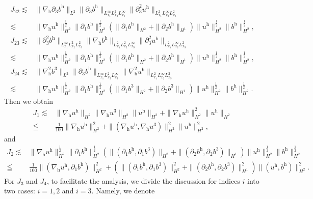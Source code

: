 \documentclass[11pt]{amsart}
\theoremstyle{definition}
\newcommand{\h}{\mathrm{h}}
\newcommand{\nablah}{\nabla_{\mathrm{h}}}
\numberwithin{equation}{section}
\begin{document}
\begin{align*}
	J_{22}\lesssim &\|\nablah\partial_3b^\h\|_{L^2}\|\partial_3 b^\h  \|_{L^\infty_{x_1}L^2_{x_2}L^\infty_{x_3}}\|\partial_3^2 u^\h \|_{L^2_{x_1}L^\infty_{x_2}L^2_{x_3}}\\
	\lesssim&\|\nabla_\mathrm{h} u^\mathrm{h}\|_{H^2}^\frac12\|\partial_1b^\h\|_{H^2}^\frac12\left(\|\partial_1 b^\h\|_{H^2}+\|\partial_2 b^\h\|_{H^1}\right)\|u^\mathrm{h}\|_{H^2}^\frac12\| b^\h\|_{H^2}^\frac12 ,\\
	J_{23}\lesssim &\|\partial_3^2b^\h\|_{L^\infty_{x_1}L^2_{x_2}L^2_{x_3}}\|\nablah b^\h\|_{L^2_{x_1}L^2_{x_2}L^\infty_{x_3}}\|\partial_3^2 u^\h \|_{L^2_{x_1}L^\infty_{x_2}L^2_{x_3}}	\\
	\lesssim&\|\nabla_\mathrm{h} u^\mathrm{h}\|_{H^2}^\frac12\|\partial_1b^\h\|_{H^2}^\frac12\left(\|\partial_1 b^\h\|_{H^2}+\|\partial_2 b^\h\|_{H^1}\right)\|u^\mathrm{h}\|_{H^2}^\frac12\| b^\h\|_{H^2}^\frac12 ,\\
	J_{24}\lesssim&\|\nablah^2 b^3 \|_{L^2}\|\partial_3 b^\h\|_{L^\infty_{x_1}L^2_{x_2}L^\infty_{x_3}}\|\nablah^2 u ^\h\|_{L^2_{x_1}L^\infty_{x_2}L^2_{x_3}}\\
	\lesssim&\|\nabla_\mathrm{h} u^\mathrm{h}\|_{H^2}^\frac12\|\partial_1b^\h\|_{H^2}^\frac12\left(\|\partial_1 b^3\|_{H^2}+\|\partial_2 b^3\|_{H^1}\right)\|u^\mathrm{h}\|_{H^2}^\frac12\| b^\h\|_{H^2}^\frac12 .
\end{align*}
Then we obtain
\begin{align}\label{J_1}
	J_1\lesssim& \|\nabla_\mathrm{h} u^\mathrm{h}\|_{H^2}\|\nabla_\mathrm{h} u^3\|_{H^2}\| u^\mathrm{h}\|_{H^2}+\|\nabla_\mathrm{h} u^\mathrm{h}\|_{H^2}^2\| u^\mathrm{h}\|_{H^2}\nonumber\\
	\leqq &\frac{1}{100}\|\nabla_\mathrm{h} u^\mathrm{h}\|_{H^2}^2+\|(\nabla_\mathrm{h} u^\mathrm{h},\nabla_\mathrm{h} u^{3})\|_{H^2}^2\| u^\mathrm{h}\|_{H^2}^2,
\end{align}
and
\begin{align}\label{J_2}
	J_2\lesssim&\|\nabla_\mathrm{h} u^\mathrm{h}\|_{H^2}^\frac12\|\partial_1b^\h\|_{H^2}^\frac12\left(\|(\partial_1 b^\h,\partial_1b^3)\|_{H^2}+\|(\partial_2 b^\h,\partial_2b^3)\|_{H^1}\right)\|u^\mathrm{h}\|_{H^2}^\frac12\| b^\h\|_{H^2}^\frac12\nonumber\\
	\leqq &\frac{1}{100}\|(\nabla_\mathrm{h} u^\mathrm{h},\partial_1b^\h)\|_{H^2}^2+\left(\|(\partial_1 b^\h,\partial_1b^3)\|_{H^2}^2+\|(\partial_2 b^\h,\partial_2b^3)\|_{H^1}^2\right)\| (u^\mathrm{h},b^\h)\|_{H^2}^2.
\end{align}
For $J_{3}$ and $J_{4}$, to facilitate the analysis, we divide the discussion for indices $i$ into two cases: $i=1,2$ and $i=3$. Namely, we denote
\end{document}
